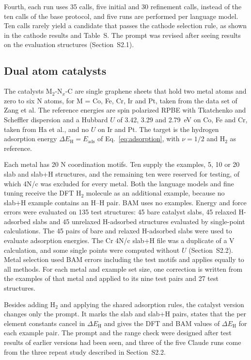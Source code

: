 Fourth, each run uses 35 calls, five initial and 30 refinement calls, instead of the ten calls of the base protocol, and five runs are performed per language model. Ten calls rarely yield a candidate that passes the cathode selection rule, as shown in the cathode results and Table~S\fi. The prompt was revised after seeing results on the evaluation structures (Section~S2.1).

\subsection{Dual atom catalysts}
\label{sec:catalyst-methods}

The catalysts M$_2$-N$_x$-C are single graphene sheets that hold two metal atoms and zero to six N atoms, for M = Co, Fe, Cr, Ir and Pt, taken from the data set of Zang et al.\cite{zang2026dac} The reference energies are spin polarized RPBE with Tkatchenko and Scheffler dispersion and a Hubbard $U$ of 3.42, 3.29 and 2.79~eV on Co, Fe and Cr, taken from Ha et al.,\cite{ha2021tuning} and no $U$ on Ir and Pt. The target is the hydrogen adsorption energy $\Delta E_\mathrm{H}=E_\mathrm{ads}$ of Eq.~\eqref{eq:adsorption}, with $\nu=1/2$ and H$_2$ as reference.

Each metal has 20 N coordination motifs. Ten supply the examples, 5, 10 or 20 slab and slab+H structures, and the remaining ten were reserved for testing, of which 4N/c was excluded for every metal. Both the language models and fine tuning receive the DFT H$_2$ molecule as an additional example, because no slab+H example contains an H--H pair. BAM uses no examples. Energy and force errors were evaluated on 135 test structures: 45 bare catalyst slabs, 45 relaxed H-adsorbed slabs and 45 unrelaxed H-adsorbed structures evaluated by single-point calculations. The 45 pairs of bare and relaxed H-adsorbed slabs were used to evaluate adsorption energies. The Cr 4N/c slab+H file was a duplicate of a V calculation, and some single points were computed without $U$ (Section~S2.2). Metal selection used BAM errors including the test motifs and applies equally to all methods. For each metal and example set size, one correction is written from the examples of that metal and applied to its nine test pairs and 27 test structures.

Besides adding H$_2$ and applying the shared adsorption rules, the catalyst version changes only the prompt. It marks the slab and slab+H pairs, states that the per element constants cancel in $\Delta E_\mathrm{H}$ and gives the DFT and BAM values of $\Delta E_\mathrm{H}$ for each example pair. The prompt and the range check were designed after test results of earlier versions had been seen, and three of the five Claude runs come from the three repeat study described in Section~S2.2.

